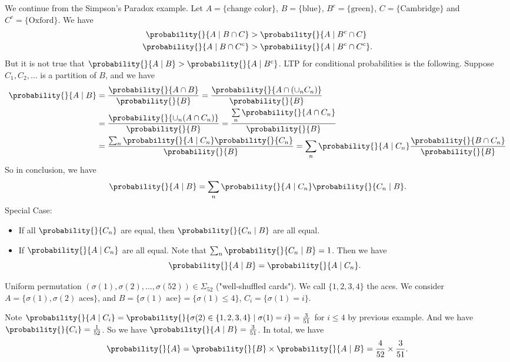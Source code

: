 We continue from the Simpson's Paradox example. Let \(A = \{\text{change color}\}\), \(B = \{ \text{blue}\}\), \(B^c = \{\text{green}\}\), \(C = \{\text{Cambridge}\}\) and \(C^c = \{\text{Oxford}\}\). We have
\begin{align*}
    \probability{}{A\mid B \cap C} &> \probability{}{A \mid B^c \cap C}\\
    \probability{}{A\mid B \cap C^c} &> \probability{}{A \mid B^c \cap C^c}.
\end{align*}
    But it is not true that \(\probability{}{A \mid B} > \probability{}{A \mid B^c} \). LTP for conditional probabilities is the following. Suppose \(C_1, C_2, \ldots\) is a partition of \(B\), and we have
    \begin{align*}
        \probability{}{A\mid B} &= \frac{\probability{}{A \cap B}}{\probability{}{B}} = \frac{\probability{}{A \cap (\cup_n C_n)}}{\probability{}{B} }\\
        &= \frac{\probability{}{\cup_n (A \cap C_n)} }{\probability{}{B} } = \frac{\sum\limits_{n}\probability{}{A \cap C_n} }{\probability{}{B}}\\
        &= \frac{\sum_n \probability{}{A \mid C_n} \probability{}{C_n}}{\probability{}{B} } = \sum_n \probability{}{A\mid C_n} \frac{\probability{}{B \cap C_n}}{\probability{}{B}}
    \end{align*}
    So in conclusion, we have
    \[
        \probability{}{A\mid B} = \sum_n \probability{}{A\mid C_n} \probability{}{C_n\mid B} .
    \]
Special Case:
\begin{itemize}
\item If all \(\probability{}{C_n}\) are equal, then \(\probability{}{C_n \mid B} \) are all equal.
\item If \(\probability{}{A\mid C_n} \) are all equal. Note that \(\sum_n \probability{}{C_n \mid B}=1\). Then we have
\[
    \probability{}{A\mid B} = \probability{}{A\mid C_n}.
\]
\end{itemize}
\begin{example}
    Uniform permutation \((\sigma(1),\sigma(2), \ldots , \sigma(52)) \in \Sigma_{52}\) ("well-shuffled cards"). We call \(\{1,2,3,4\}\) the aces. We consider \(A= \{\sigma(1), \sigma(2)\text{ aces}\}\), and \(B = \{\sigma(1) \text{ ace}\} = \{\sigma(1) \leq 4\}\), \(C_i = \{\sigma(1) = i\}\).

    Note \(\probability{}{A \mid C_i} = \probability{}{\sigma(2) \in \{1,2,3,4\} \mid \sigma(1) = i} = \frac{3}{51}\)  for \(i \leq 4\) by previous example. And we have \(\probability{}{C_i}  = \frac{1}{52}\). So we have \(\probability{}{A\mid B} = \frac{3}{51}\). In total, we have
    \[
        \probability{}{A} = \probability{}{B} \times \probability{}{A\mid B} = \frac{4}{52}\times \frac{3}{51}.
    \]
\end{example}
